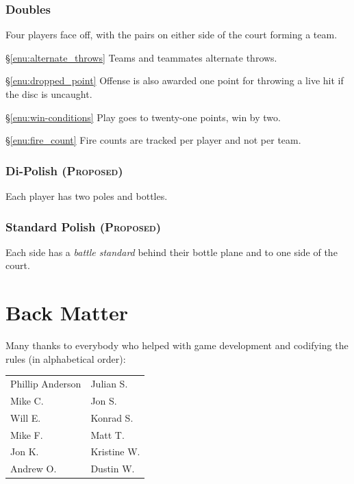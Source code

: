 \documentclass[11pt,letterpaper,twocolumn,english,DIV=calc]{scrartcl}
\newcommand{\proposed}{{\color{DarkRed} \textsc{(Proposed) }}}
\begin{document}
\section{Doubles}
Four players face off, with the pairs on either side of the court forming a team. 

\begin{description}
	\item{\S\ref{enu:alternate_throws}} Teams and teammates alternate throws. 
	\item{\S\ref{enu:dropped_point}} Offense is also awarded one point for throwing a live hit if the disc is uncaught.
	\item{\S\ref{enu:win-conditions}} Play goes to twenty-one points, win by two.
	\item{\S\ref{enu:fire_count}} Fire counts are tracked per player and not per team.
\end{description}

\section{Di-Polish \proposed}
Each player has two poles and bottles.

\section{Standard Polish \proposed}
Each side has a \emph{battle standard} behind their bottle plane and to one side of the court.


\newpage

\part*{Back Matter}


Many thanks to everybody who helped with game development and codifying the rules (in alphabetical order):\medskip{}

\begin{tabular}{>{\raggedright}p{3.5cm}>{\raggedright}p{2.5cm}}
	Phillip Anderson & Julian S.\tabularnewline
	Mike C. & Jon S.\tabularnewline
	Will E. & Konrad S.\tabularnewline
	Mike F. & Matt T.\tabularnewline
	Jon K. & Kristine W.\tabularnewline
	Andrew O. & Dustin W.\tabularnewline
\end{tabular}
\end{document}
